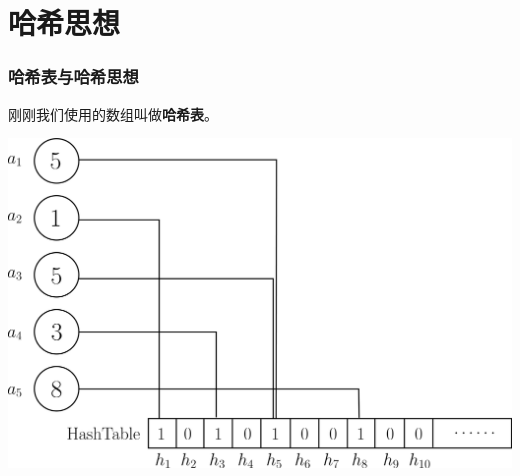 \documentclass[11pt]{beamer}
\begin{document}
\section{哈希思想}
\begin{frame}
\frametitle{哈希表与哈希思想}
\quad 刚刚我们使用的数组叫做\textbf{哈希表}。

\begin{center}
\includegraphics[scale=0.1]{HashTable.png}
\end{center}


\end{frame}
\end{document}
